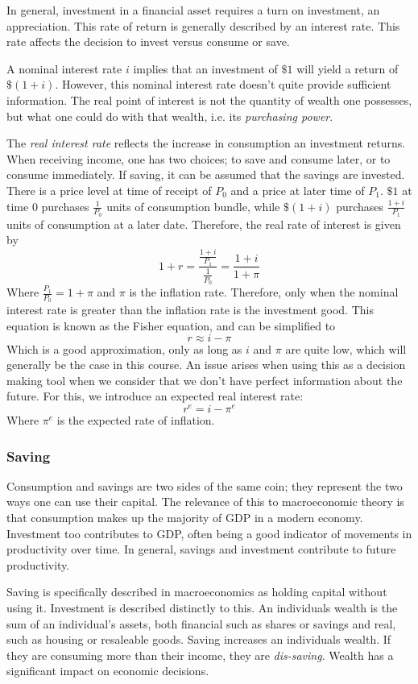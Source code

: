 \documentclass[12pt]{report}
\begin{document}
\begin{flushleft}
In general, investment in a financial asset requires a turn on investment, an
appreciation. This rate of return is generally described by an interest rate.
This rate affects the decision to invest versus consume or save. \par
A nominal interest rate \(i\) implies that an investment of \(\$1\) will yield
a return of \(\$(1 + i)\). However, this nominal interest rate doesn't quite
provide sufficient information. The real point of interest is not the quantity
of wealth one possesses, but what one could do with that wealth, i.e. its
\textit{purchasing power}. \par
The \textit{real interest rate} reflects the increase in consumption an 
investment returns. When receiving income, one has two choices; to save and
consume later, or to consume immediately. If saving, it can be assumed that
the savings are invested. There is a price level at time of receipt of \(P_0\)
and a price at later time of \(P_1\). \(\$1\) at time \(0\) purchases 
\(\frac{1}{P_0}\) units of consumption bundle, while \(\$(1 + i)\) purchases
\(\frac{1 + i}{P_1}\) units of consumption at a later date. Therefore, the real
rate of interest is given by
\[1 + r = \frac{\frac{1 + i}{P_1}}{\frac{1}{P_0}} = \frac{1 + i}{1 + \pi}\]
Where \(\frac{P_1}{P_0} = 1 + \pi\) and \(\pi\) is the inflation rate.
Therefore, only when the nominal interest rate is greater than the inflation 
rate is the investment good. This equation is known as the Fisher equation,
and can be simplified to
\[r \approx i - \pi\]
Which is a good approximation, only as long as \(i\) and \(\pi\) are quite low,
which will generally be the case in this course. An issue arises when using 
this as a decision making tool when we consider that we don't have perfect 
information about the future. For this, we introduce an expected real interest
rate:
\[r^e = i - \pi^e\]
Where \(\pi^e\) is the expected rate of inflation.

\subsubsection*{Saving}

Consumption and savings are two sides of the same coin; they represent the two
ways one can use their capital. The relevance of this to macroeconomic theory 
is that consumption makes up the majority of GDP in a modern economy. 
Investment too contributes to GDP, often being a good indicator of movements in
productivity over time. In general, savings and investment contribute to future
productivity. \par
Saving is specifically described in macroeconomics as holding capital without 
using it. Investment is described distinctly to this. An individuals wealth is
the sum of an individual's assets, both financial such as shares or savings and
real, such as housing or resaleable goods. Saving increases an individuals 
wealth. If they are consuming more than their income, they are 
\textit{dis-saving}. Wealth has a significant impact on economic decisions. 


\end{flushleft}
\end{document}
